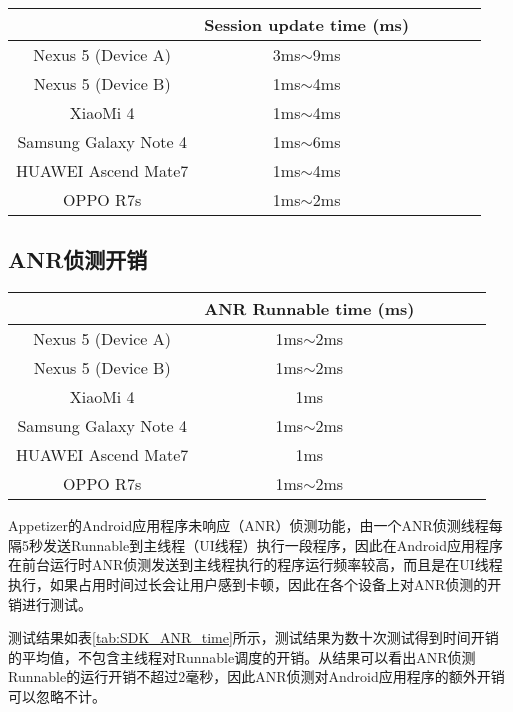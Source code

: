 \begin{table}[!hpb]
	\centering
	\begin{tabular}{c c c c c c} \toprule
		& Session update time (ms) \\ \midrule
		Nexus 5 (Device A) & 3ms$\sim$9ms \\
		Nexus 5 (Device B) & 1ms$\sim$4ms \\
		XiaoMi 4 & 1ms$\sim$4ms \\
		Samsung Galaxy Note 4 & 1ms$\sim$6ms \\
		HUAWEI Ascend Mate7 & 1ms$\sim$4ms \\
		OPPO R7s & 1ms$\sim$2ms \\ \bottomrule
	\end{tabular}
\end{table}


\subsection{ANR侦测开销}
\label{subsec:anr_cost}

\begin{table}[!hpb]
	\centering
	\begin{tabular}{c c c c c c} \toprule
		& ANR Runnable time (ms) \\ \midrule
		Nexus 5 (Device A) & 1ms$\sim$2ms \\
		Nexus 5 (Device B) & 1ms$\sim$2ms \\
		XiaoMi 4 & 1ms \\
		Samsung Galaxy Note 4 & 1ms$\sim$2ms \\
		HUAWEI Ascend Mate7 & 1ms \\
		OPPO R7s & 1ms$\sim$2ms \\ \bottomrule
	\end{tabular}
\end{table}

Appetizer的Android应用程序未响应（ANR）侦测功能，由一个ANR侦测线程每隔5秒发送Runnable到主线程（UI线程）执行一段程序，因此在Android应用程序在前台运行时ANR侦测发送到主线程执行的程序运行频率较高，而且是在UI线程执行，如果占用时间过长会让用户感到卡顿，因此在各个设备上对ANR侦测的开销进行测试。

测试结果如表\ref{tab:SDK_ANR_time}所示，测试结果为数十次测试得到时间开销的平均值，不包含主线程对Runnable调度的开销。从结果可以看出ANR侦测Runnable的运行开销不超过2毫秒，因此ANR侦测对Android应用程序的额外开销可以忽略不计。

